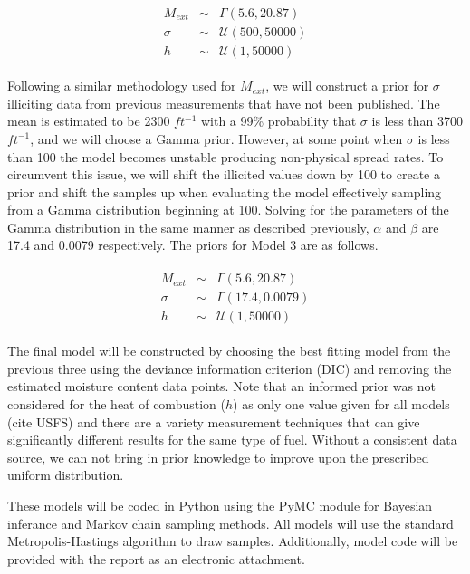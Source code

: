 \documentclass[11pt]{article}
\begin{document}
\begin{align}
\begin{array}{ccc}
M_{ext} &\sim& \Gamma(5.6,20.87) \\
\sigma &\sim& \mathcal{U}(500,50000) \\
h &\sim& \mathcal{U}(1,50000)
\end{array}
\label{eq:mod2_priors}
\end{align}

Following a similar methodology used for $M_{ext}$, we will construct a prior for $\sigma$ illiciting data from previous measurements that have not been published. The mean is estimated to be 2300 $ft^{-1}$ with a 99\% probability that $\sigma$ is less than 3700 $ft^{-1}$, and we will choose a Gamma prior. However, at some point when $\sigma$ is less than 100 the model becomes unstable producing non-physical spread rates. To circumvent this issue, we will shift the illicited values down by 100 to create a prior and shift the samples up when evaluating the model effectively sampling from a Gamma distribution beginning at 100. Solving for the parameters of the Gamma distribution in the same manner as described previously, $\alpha$ and $\beta$ are 17.4 and 0.0079 respectively. The priors for Model 3 are as follows. 

\begin{align}
\begin{array}{ccc}
M_{ext} &\sim& \Gamma(5.6,20.87) \\
\sigma &\sim& \Gamma(17.4,0.0079) \\
h &\sim& \mathcal{U}(1,50000)
\end{array}
\label{eq:mod3_priors}
\end{align}

The final model will be constructed by choosing the best fitting model from the previous three using the deviance information criterion (DIC) and removing the estimated moisture content data points. Note that an informed prior was not considered for the heat of combustion ($h$) as only one value given for all models (cite USFS) and there are a variety measurement techniques that can give significantly different results for the same type of fuel. Without a consistent data source, we can not bring in prior knowledge to improve upon the prescribed uniform distribution. 

These models will be coded in Python using the PyMC module for Bayesian inferance and Markov chain sampling methods. All models will use the standard Metropolis-Hastings algorithm to draw samples. Additionally, model code will be provided with the report as an electronic attachment.
\end{document}
